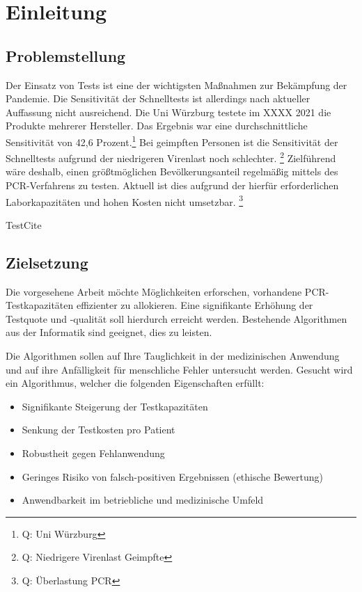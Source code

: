 
\chapter{Einleitung}
\section{Problemstellung}
Der Einsatz von Tests ist eine der wichtigsten Maßnahmen zur Bekämpfung der Pandemie.
Die Sensitivität der Schnelltests ist allerdings nach aktueller Auffassung nicht ausreichend.
Die Uni Würzburg testete im XXXX 2021 die Produkte mehrerer Hersteller.
Das Ergebnis war eine durchschnittliche Sensitivität von 42,6 Prozent.\footnote{Q: Uni Würzburg}
Bei geimpften Personen ist die Sensitivität der Schnelltests aufgrund der niedrigeren Virenlast noch schlechter. \footnote{Q: Niedrigere Virenlast Geimpfte}
Zielführend wäre deshalb, einen größtmöglichen Bevölkerungsanteil regelmäßig mittels des PCR-Verfahrens zu testen.
Aktuell ist dies aufgrund der hierfür erforderlichen Laborkapazitäten und hohen Kosten nicht umsetzbar. \footnote{Q: Überlastung PCR}

TestCite \cite{dreyfus:1980}

\section{Zielsetzung}
Die vorgesehene Arbeit möchte Möglichkeiten erforschen, vorhandene PCR-Testkapazitäten effizienter zu allokieren.
Eine signifikante Erhöhung der Testquote und -qualität soll hierdurch erreicht werden.
Bestehende Algorithmen aus der Informatik sind geeignet, dies zu leisten.

Die Algorithmen sollen auf Ihre Tauglichkeit in der medizinischen Anwendung und auf ihre Anfälligkeit für menschliche Fehler untersucht werden.
Gesucht wird ein Algorithmus, welcher die folgenden Eigenschaften erfüllt:

\begin{itemize}
\item Signifikante Steigerung der Testkapazitäten
\item Senkung der Testkosten pro Patient
\item Robustheit gegen Fehlanwendung
\item Geringes Risiko von falsch-positiven Ergebnissen (ethische Bewertung)
\item Anwendbarkeit im betriebliche und medizinische Umfeld
\end{itemize}


